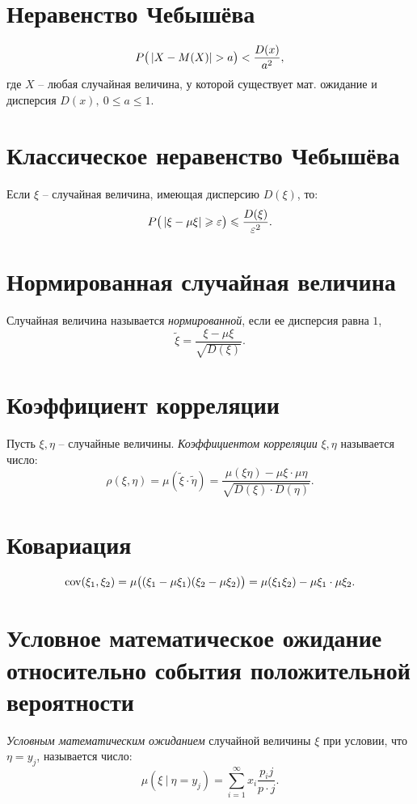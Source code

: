 \section{Неравенство Чебышёва}

\[
	P \big(\left\lvert X - M(X)\right\rvert > a\big) < \frac{D(x)}{a^2},
\]
где $X$ -- любая случайная величина, у которой существует мат. ожидание и дисперсия $D(x), \ 0 \leqslant a \leqslant 1$.

\section{Классическое неравенство Чебышёва}

Если $\xi $ -- случайная величина, имеющая дисперсию $D(\xi )$, то:
\[
	P \big(\left\lvert \xi - \mu \xi \right\rvert \geqslant \varepsilon \big) \leqslant \frac{D(\xi )}{\varepsilon ^2} .
\]

\section{Нормированная случайная величина}

\begin{definition}
	Случайная величина называется \emph{нормированной}, если ее дисперсия равна $1$,
	\[
		\widetilde{\xi } = \frac{\xi - \mu \xi }{\sqrt{D(\xi )} } .
	\]
\end{definition}

\section{Коэффициент корреляции}

\begin{definition}
	Пусть $\xi ,\eta$ -- случайные величины. \emph{Коэффициентом корреляции} $\xi , \eta$ называется число:
	\[
		\rho (\xi ,\eta) = \mu (\widetilde{\xi } \cdot \widetilde{\eta}) = \frac{\mu (\xi \eta) - \mu \xi \cdot \mu \eta}{\sqrt{D(\xi )\cdot D(\eta)} } .
	\]
\end{definition}

\section{Ковариация}

\[
	\operatorname{cov} (\xi _1,\xi _2) = \mu \big((\xi _1 - \mu \xi _1)(\xi _2 - \mu \xi _2)\big) = \mu (\xi _1 \xi _2) - \mu \xi _1 \cdot \mu \xi _2.
\]

\newpage

\section{Условное математическое ожидание относительно события положительной вероятности}

\begin{definition}
	\emph{Условным математическим ожиданием} случайной величины $\xi $ при условии, что $\eta = y_j$, называется число:
	\[
		\mu (\xi \ | \ \eta = y_j) = \sum_{i=1}^{\infty } x_i \frac{p_i j}{p \cdot j} .
	\]
\end{definition}
